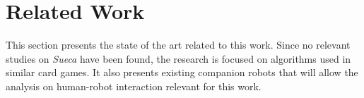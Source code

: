 
\section{Related Work}
\label{sec:related-work}

This section presents the state of the art related to this work.
Since no relevant studies on \emph{Sueca} have been found, the research is focused on algorithms used in similar card games.
It also presents existing companion robots that will allow the analysis on human-robot interaction relevant for this work.



